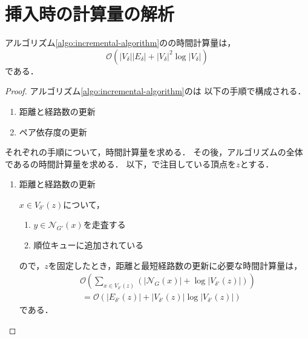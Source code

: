 \section{挿入時の計算量の解析}
\label{subsect:computational-complexity-of-incremental-algorithm}

\begin{lemma}
  アルゴリズム\ref{algo:incremental-algorithm}のの時間計算量は，
  \[ \mathcal{O}(\lvert V_\delta\rvert\lvert E_\delta\rvert
  +\lvert V_\delta\rvert^2\log \lvert V_\delta\rvert) \]
  である．
\end{lemma}
\begin{proof}
  アルゴリズム\ref{algo:incremental-algorithm}のは
  以下の手順で構成される．
  \begin{enumerate}[label=(\alph*)]
  \item 距離と経路数の更新
  \item ペア依存度の更新
  \end{enumerate}
  それぞれの手順について，時間計算量を求める．
  その後，アルゴリズムの全体であるの時間計算量を求める．
  以下，で注目している頂点を$z$とする．

  \begin{enumerate}[label=(\alph*)]
  \item 距離と経路数の更新
    \par $x\in V_{\delta'}(z)$について，
    \begin{enumerate}[label=\arabic*.]
    \item $y\in\mathcal{N}_{G'}(x)$を走査する
    \item 順位キューに追加されている
    \end{enumerate}
    ので，$z$を固定したとき，距離と最短経路数の更新に必要な時間計算量は，
    \begin{equation}
      \begin{aligned}
        &\mathcal{O}(\sum_{x\in V_{\delta'}(z)}(\lvert\mathcal{N}_G(x)\rvert
        +\log\lvert V_{\delta'}(z)\rvert)) \nonumber\\
        &\:=\mathcal{O}(\lvert E_{\delta'}(z)\rvert
        +\lvert V_{\delta'}(z)\rvert\log\lvert V_{\delta'}(z)\rvert) \nonumber
      \end{aligned}
    \end{equation}
    である．


\end{enumerate}
\end{proof}

